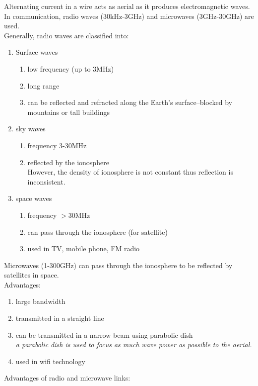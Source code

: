 \documentclass{article}
\begin{document}
Alternating current in a wire acts as aerial as it produces electromagnetic waves. In communication, radio waves (30kHz-3GHz) and microwaves (3GHz-30GHz) are used. 
\\Generally, radio waves are classified into:
\begin{enumerate}
    \item Surface waves 
    \begin{enumerate}
        \item low frequency (up to 3MHz)
        \item long range
        \item can be reflected and refracted along the Earth's surface--blocked by mountains or tall buildings
    \end{enumerate}
    \item sky waves
    \begin{enumerate}
        \item frequency 3-30MHz
        \item reflected by the ionosphere\\
        However, the density of ionosphere is not constant thus reflection is inconsistent.
    \end{enumerate}
    \item space waves
    \begin{enumerate}
        \item frequency $>$30MHz
        \item can pass through the ionosphere (for satellite)
        \item used in TV, mobile phone, FM radio
    \end{enumerate}
\end{enumerate}
Microwaves (1-300GHz) can pass through the ionosphere to be reflected by satellites in space.
\\Advantages:
\begin{enumerate}
    \item large bandwidth
    \item transmitted in a straight line
    \item can be transmitted in a narrow beam using parabolic dish\\
    \textit{a parabolic dish is used to focus as much wave power as possible to the aerial.}
    \item used in wifi technology
\end{enumerate}
\begin{flushleft}
Advantages of radio and microwave links:
\end{flushleft}
\end{document}

